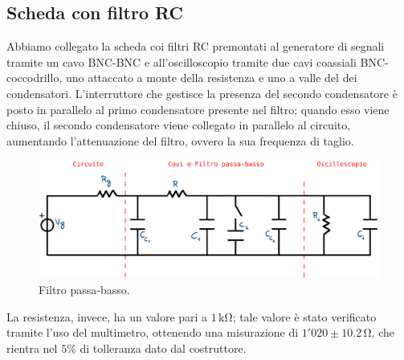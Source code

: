\documentclass[a4paper]{article}
\begin{document}
		\subsection{Scheda con filtro RC}
			Abbiamo collegato la scheda coi filtri RC premontati al generatore di segnali tramite un cavo BNC-BNC e all'oscilloscopio tramite due cavi coassiali BNC-coccodrillo, uno attaccato a monte della resistenza e uno a valle del dei condensatori.
			\newline
			L'interruttore che gestisce la presenza del secondo condensatore è posto in parallelo al primo condensatore presente nel filtro; quando esso viene chiuso, il secondo condensatore viene collegato in parallelo al circuito, aumentando l'attenuazione del filtro, ovvero la sua frequenza di taglio.
			\begin{figure}[h!]
				\centering
				\includegraphics[scale=0.5]{circuitoFiltroPassaBasso}
				\caption{Filtro passa-basso.}
				\label{fig:circuitoFiltroPassaBasso}
			\end{figure}
			\newpage
			La resistenza, invece, ha un valore pari a $ 1 \, \mathrm{k\Omega} $; tale valore è stato verificato tramite l'uso del multimetro, ottenendo una misurazione di $ 1'020 \pm 10.2 \, \mathrm{\Omega} $, che rientra nel $ 5 \% $ di tolleranza dato dal costruttore.
\end{document}
